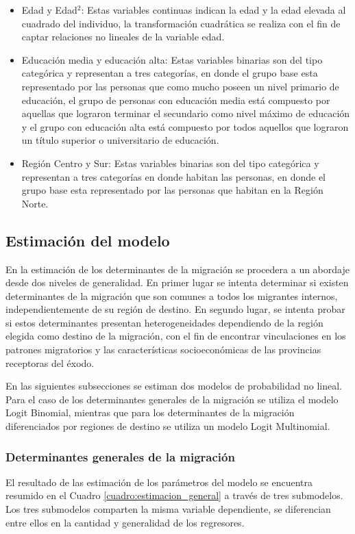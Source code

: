 \documentclass[12pt,a4paper]{article}
\begin{document}
\begin{itemize}
\item Edad y Edad$^{2}$: Estas variables continuas indican la edad  y la edad elevada al cuadrado del individuo, la transformación cuadrática se realiza con el fin de captar relaciones no lineales de la variable edad. 
\item Educación media y educación alta: Estas variables binarias son del tipo categórica y representan a tres categorías, en donde el grupo base esta representado por las personas que como mucho poseen un nivel primario de educación, el grupo de personas con educación media está compuesto por aquellas que lograron terminar el secundario como nivel máximo de educación y el grupo con educación alta está compuesto por todos aquellos que lograron un título superior o universitario de educación.
\item Región Centro y Sur: Estas variables binarias son del tipo categórica y representan a tres categorías en donde habitan las personas, en donde el grupo base esta representado por las personas que habitan en la Región Norte.
\end{itemize}

\subsection{Estimación del modelo}
En la estimación de los determinantes de la migración se procedera a un abordaje desde dos niveles de generalidad. En primer lugar se intenta determinar si existen determinantes de la migración que son comunes a todos los migrantes internos, independientemente de su región de destino. En segundo lugar, se intenta probar si estos determinantes presentan heterogeneidades dependiendo de la región elegida como destino de la migración, con el fin de encontrar vinculaciones en los patrones migratorios y las características socioeconómicas de las provincias receptoras del éxodo.

En las siguientes subsecciones se estiman dos modelos de probabilidad no lineal. Para el caso de los determinantes generales de la migración se utiliza el modelo Logit Binomial, mientras que para los determinantes de la migración diferenciados por regiones de destino se utiliza un modelo Logit Multinomial.
\subsubsection{Determinantes generales de la migración}
El resultado de las estimación de los parámetros del modelo se encuentra resumido en el Cuadro \ref{cuadro:estimacion_general} a través de tres submodelos.
Los tres submodelos comparten la misma variable dependiente, se diferencian entre ellos en la cantidad y generalidad de los regresores.
\end{document}
